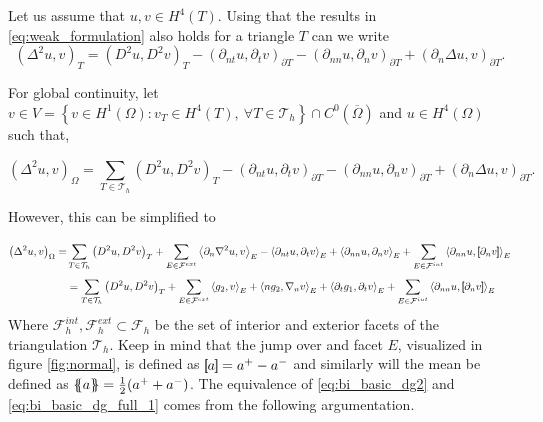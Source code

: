 Let us assume that $u,v \in
H^{4}\left( T  \right) $. Using that the results in \eqref{eq:weak_formulation} also holds for a triangle $T$ can we write
\begin{equation}
\label{eq:bi_basic_dg}
\left( \Delta  ^{2} u,v \right) _{T} =  \left( D^2u,D^2v \right) _{T } - \left(\partial _{nt} u, \partial _{t}v
\right)_{\partial T} - \left(\partial _{nn} u, \partial _{n}v \right)_{\partial T} + \left(\partial _{n} \Delta  u,v
\right)_{\partial T}
.\end{equation}

For global continuity, let  $v \in V =  \left\{ v \in H^{1}\left( \Omega  \right): v_{T} \in  H^{4}\left( T \right), \ \forall T \in
\mathcal{T}_{h}    \right\}   \cap C^{0} (
\overline{\Omega }  ) $ and $u \in  H^{4}\left( \Omega  \right) $ such that,

\begin{equation}
\label{eq:bi_basic_dg2}
\left( \Delta  ^{2} u,v \right) _{\Omega } = \sum_{T \in  \mathcal{T} _{h}}^{}  \left( D^2u,D^2v \right) _{T } - \left(\partial _{nt} u, \partial _{t}v
\right)_{\partial T} - \left(\partial _{nn} u, \partial _{n}v \right)_{\partial T} + \left(\partial _{n} \Delta  u,v
\right)_{\partial T}.\end{equation}

However, this can be simplified to

\begin{equation}
\label{eq:bi_basic_dg_full_1}
\begin{split}
\left( \Delta  ^{2} u, v \right) _{\Omega }
=& \sum_{T \in  \mathcal{T} _{h}}^{} \left( D^2u, D^2v \right)_{T}  + \sum_{E \in
\mathcal{F} ^{ext}_{}}^{} \left<\partial _{n} \nabla  ^2 u, v  \right> _{E}
- \left<\partial _{nt} u, \partial _{t} v \right> _{E}+
\left< \partial _{nn} u, \partial _{n} v \right>_{E} + \sum_{E \in \mathcal{F}  ^{int}}^{} \left<\partial _{nn} u , \jump{ \partial _{n} v }
\right>_{E} \\
& = \sum_{T \in  \mathcal{T} _{h}}^{} \left( D^2u, D^2v \right)_{T} + \sum_{E \in
\mathcal{F} ^{ext}_{}}^{} \left<g_{2 }, v  \right> _{E}
+ \left<n g_{2}, \nabla _{n}v \right>_{E} + \left<\partial _{t} g_{1} , \partial _{t}v \right>_{E}
+ \sum_{E \in \mathcal{F}  ^{int}}^{} \left< \partial _{nn} u    , \jump{ \partial_{n} v } \right>_{E}
\end{split}
\end{equation}
Where $\mathcal{F}^{int}_h , \mathcal{F} ^{ext}_{h} \subset \mathcal{F}_{h} $ be the set of interior and exterior facets of the triangulation $\mathcal{T}_{h} $.
Keep in mind that the jump over and facet $E$, visualized in figure \ref{fig:normal},   is defined as $\left[\!\!\left[  a  \right]\!\!\right] =    a^{+} - a^{-} $
and similarly will the mean be defined as $\left\{\!\!\left\{ a  \right\}\!\!\right\} = \frac{1}{2}(   a^{+}
+ a^{-})$.  The equivalence of \eqref{eq:bi_basic_dg2} and \eqref{eq:bi_basic_dg_full_1} comes from the following argumentation.

